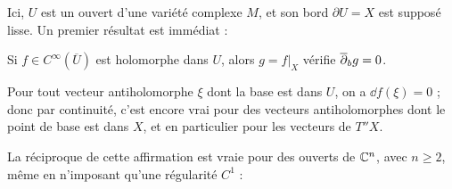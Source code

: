 Ici, $U$ est un ouvert d'une variété complexe $M$, et son bord $\partial U=X$ est supposé lisse. Un premier résultat est immédiat :

\begin{prop}
	Si $f \in C^{\infty}(\overline{U})$ est holomorphe dans $U$, alors $g=f|_X$ vérifie $\overline{\partial}_b g=0$.
\end{prop}
\begin{preuve}
	Pour tout vecteur antiholomorphe $\xi$ dont la base est dans $U$, on a $\dd f(\xi)=0$ ; donc par continuité, c'est encore vrai pour des vecteurs antiholomorphes dont le point de base est dans $X$, et en particulier pour les vecteurs de $T''X$.
\end{preuve}

La réciproque de cette affirmation est vraie pour des ouverts de $\mathbb{C}^n$, avec $n \geq 2$, même en n'imposant qu'une régularité $C^1$ :


